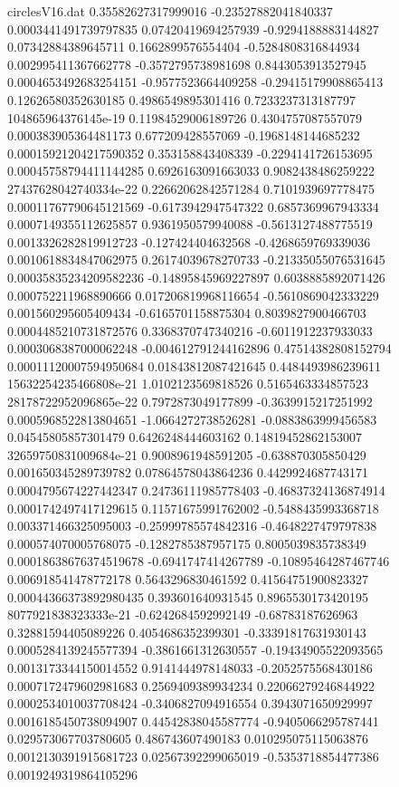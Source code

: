 \begin{filecontents}{circlesV16.dat}
0.35582627317999016	-0.23527882041840337	0.0003441491739797835
0.07420419694257939	-0.9294188883144827	0.07342884389645711
0.1662899576554404	-0.5284808316844934	0.002995411367662778
-0.3572795738981698	0.8443053913527945	0.0004653492683254151
-0.9577523664409258	-0.29415179908865413	0.12626580352630185
0.4986549895301416	0.7233237313187797	104865964376145e-19
0.11984529006189726	0.4304757087557079	0.000383905364481173
0.677209428557069	-0.1968148144685232	0.00015921204217590352
0.353158843408339	-0.2294141726153695	0.00045758794411144285
0.6926163091663033	0.9082438486259222	27437628042740334e-22
0.22662062842571284	0.7101939697778475	0.00011767790645121569
-0.6173942947547322	0.6857369967943334	0.0007149355112625857
0.9361950579940088	-0.5613127488775519	0.0013326282819912723
-0.127424404632568	-0.4268659769339036	0.0010618834847062975
0.26174039678270733	-0.21335055076531645	0.00035835234209582236
-0.14895845969227897	0.6038885892071426	0.000752211968890666
0.017206819968116654	-0.5610869042333229	0.001560295605409434
-0.6165701158875304	0.8039827900466703	0.0004485210731872576
0.3368370747340216	-0.6011912237933033	0.0003068387000062248
-0.004612791244162896	0.47514382808152794	0.00011120007594950684
0.01843812087421645	0.4484493986239611	15632254235466808e-21
1.0102123569818526	0.5165463334857523	28178722952096865e-22
0.7972873049177899	-0.3639915217251992	0.0005968522813804651
-1.0664272738526281	-0.0883863999456583	0.04545805857301479
0.6426248444603162	0.14819452862153007	32659750831009684e-21
0.9008961948591205	-0.638870305850429	0.001650345289739782
0.07864578043864236	0.4429924687743171	0.0004795674227442347
0.24736111985778403	-0.46837324136874914	0.0001742497417129615
0.11571675991762002	-0.5488435993368718	0.003371466325095003
-0.25999785574842316	-0.4648227479797838	0.000574070005768075
-0.1282785387957175	0.8005039835738349	0.00018638676374519678
-0.6941747414267789	-0.10895464287467746	0.006918541478772178
0.5643296830461592	0.41564751900823327	0.00044366373892980435
0.393601640931545	0.8965530173420195	8077921838323333e-21
-0.6242684592992149	-0.68783187626963	0.32881594405089226
0.4054686352399301	-0.33391817631930143	0.0005284139245577394
-0.3861661312630557	-0.19434905522093565	0.0013173344150014552
0.9141444978148033	-0.2052575568430186	0.0007172479602981683
0.2569409389934234	0.22066279246844922	0.0002534010037708424
-0.3406827094916554	0.3943071650929997	0.0016185450738094907
0.44542838045587774	-0.9405066295787441	0.029573067703780605
0.486743607490183	0.010295075115063876	0.0012130391915681723
0.02567392299065019	-0.5353718854477386	0.0019249319864105296

\end{filecontents}
